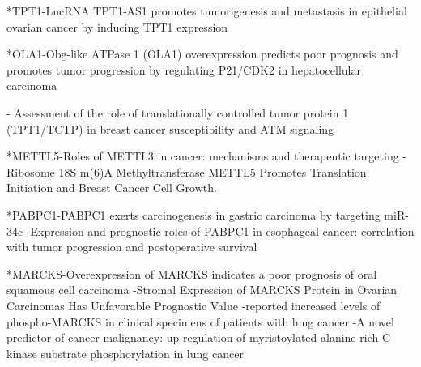 *TPT1-LncRNA TPT1‐AS1 promotes tumorigenesis and metastasis in epithelial ovarian cancer by inducing TPT1 expression

*OLA1-Obg-like ATPase 1 (OLA1) overexpression predicts poor prognosis and promotes tumor progression by regulating P21/CDK2 in hepatocellular carcinoma

- Assessment of the role of translationally controlled tumor protein 1 (TPT1/TCTP) in breast cancer susceptibility and ATM signaling

*METTL5-Roles of METTL3 in cancer: mechanisms and therapeutic targeting
- Ribosome 18S m(6)A Methyltransferase METTL5 Promotes Translation Initiation and Breast Cancer Cell Growth.

*PABPC1-PABPC1 exerts carcinogenesis in gastric carcinoma by targeting miR-34c
-Expression and prognostic roles of PABPC1 in esophageal cancer: correlation with tumor progression and postoperative survival

*MARCKS-Overexpression of MARCKS indicates a poor prognosis of oral squamous cell carcinoma
-Stromal Expression of MARCKS Protein in Ovarian
Carcinomas Has Unfavorable Prognostic Value
-reported increased levels of phospho-MARCKS in clinical specimens of patients with lung cancer
-A novel predictor of cancer malignancy: up-regulation of myristoylated alanine-rich C kinase substrate phosphorylation in lung cancer


 


